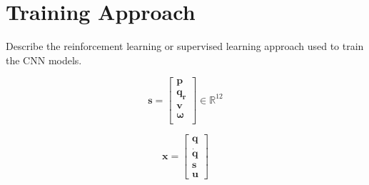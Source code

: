 \section{Training Approach}

\begin{outline}
  Describe the reinforcement learning or supervised learning approach used to train the CNN models.
\end{outline}

\[
  \mathbf{s} = \begin{bmatrix}
    \mathbf{p} \\
    \mathbf{q_r} \\
    \mathbf{v} \\
    \mathbf{\omega} \\
  \end{bmatrix} \in \mathbb{R}^{12}
\]

\[
  \mathbf{x} = \begin{bmatrix}
    \mathbf{q} \\
    \mathbf{\dot q} \\
    \mathbf{s} \\
    \mathbf{u}
  \end{bmatrix}
\]

